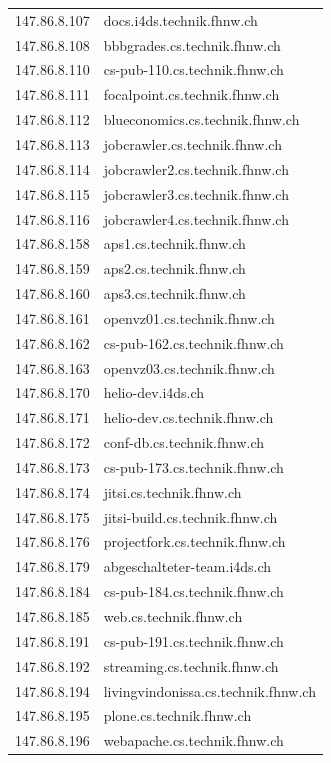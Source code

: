\documentclass[a4paper,11pt]{scrartcl}
\begin{document}
\begin{longtable}{p{2.5cm}|p{7cm}}
	147.86.8.107 & docs.i4ds.technik.fhnw.ch \\ 
	147.86.8.108 & bbbgrades.cs.technik.fhnw.ch \\ 
	147.86.8.110 & cs-pub-110.cs.technik.fhnw.ch \\ 
	147.86.8.111 & focalpoint.cs.technik.fhnw.ch \\ 
	147.86.8.112 & blueconomics.cs.technik.fhnw.ch \\ 
	147.86.8.113 & jobcrawler.cs.technik.fhnw.ch \\ 
	147.86.8.114 & jobcrawler2.cs.technik.fhnw.ch \\ 
	147.86.8.115 & jobcrawler3.cs.technik.fhnw.ch \\ 
	147.86.8.116 & jobcrawler4.cs.technik.fhnw.ch \\ 
	147.86.8.158 & aps1.cs.technik.fhnw.ch \\ 
	147.86.8.159 & aps2.cs.technik.fhnw.ch \\ 
	147.86.8.160 & aps3.cs.technik.fhnw.ch \\ 
	147.86.8.161 & openvz01.cs.technik.fhnw.ch \\ 
	147.86.8.162 & cs-pub-162.cs.technik.fhnw.ch \\ 
	147.86.8.163 & openvz03.cs.technik.fhnw.ch \\ 
	147.86.8.170 & helio-dev.i4ds.ch \\ 
	147.86.8.171 & helio-dev.cs.technik.fhnw.ch \\ 
	147.86.8.172 & conf-db.cs.technik.fhnw.ch \\ 
	147.86.8.173 & cs-pub-173.cs.technik.fhnw.ch \\ 
	147.86.8.174 & jitsi.cs.technik.fhnw.ch \\ 
	147.86.8.175 & jitsi-build.cs.technik.fhnw.ch \\ 
	147.86.8.176 & projectfork.cs.technik.fhnw.ch \\ 
	147.86.8.179 & abgeschalteter-team.i4ds.ch \\ 
	147.86.8.184 & cs-pub-184.cs.technik.fhnw.ch \\ 
	147.86.8.185 & web.cs.technik.fhnw.ch \\ 
	147.86.8.191 & cs-pub-191.cs.technik.fhnw.ch \\ 
	147.86.8.192 & streaming.cs.technik.fhnw.ch \\ 
	147.86.8.194 & livingvindonissa.cs.technik.fhnw.ch \\ 
	147.86.8.195 & plone.cs.technik.fhnw.ch \\ 
	147.86.8.196 & webapache.cs.technik.fhnw.ch \\ 

\end{longtable}
\end{document}
